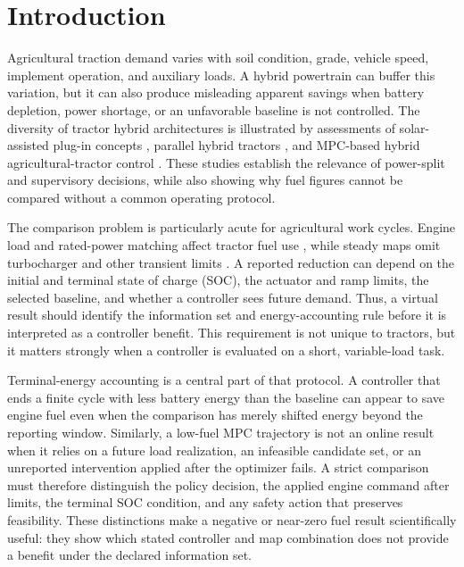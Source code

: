 \documentclass[energies,article,submit,moreauthors]{Definitions/mdpi}
\begin{document}
\section{Introduction}
Agricultural traction demand varies with soil condition, grade, vehicle speed, implement operation, and auxiliary loads. A hybrid powertrain can buffer this variation, but it can also produce misleading apparent savings when battery depletion, power shortage, or an unfavorable baseline is not controlled. The diversity of tractor hybrid architectures is illustrated by assessments of solar-assisted plug-in concepts \cite{mousazadeh2011}, parallel hybrid tractors \cite{mocera2020,mocera2020b}, and MPC-based hybrid agricultural-tractor control \cite{curiel2023}. These studies establish the relevance of power-split and supervisory decisions, while also showing why fuel figures cannot be compared without a common operating protocol.

The comparison problem is particularly acute for agricultural work cycles. Engine load and rated-power matching affect tractor fuel use \cite{jilek2008,janulevicius2010}, while steady maps omit turbocharger and other transient limits \cite{huo2018}. A reported reduction can depend on the initial and terminal state of charge (SOC), the actuator and ramp limits, the selected baseline, and whether a controller sees future demand. Thus, a virtual result should identify the information set and energy-accounting rule before it is interpreted as a controller benefit. This requirement is not unique to tractors, but it matters strongly when a controller is evaluated on a short, variable-load task.

Terminal-energy accounting is a central part of that protocol. A controller that ends a finite cycle with less battery energy than the baseline can appear to save engine fuel even when the comparison has merely shifted energy beyond the reporting window. Similarly, a low-fuel MPC trajectory is not an online result when it relies on a future load realization, an infeasible candidate set, or an unreported intervention applied after the optimizer fails. A strict comparison must therefore distinguish the policy decision, the applied engine command after limits, the terminal SOC condition, and any safety action that preserves feasibility. These distinctions make a negative or near-zero fuel result scientifically useful: they show which stated controller and map combination does not provide a benefit under the declared information set.
\end{document}
